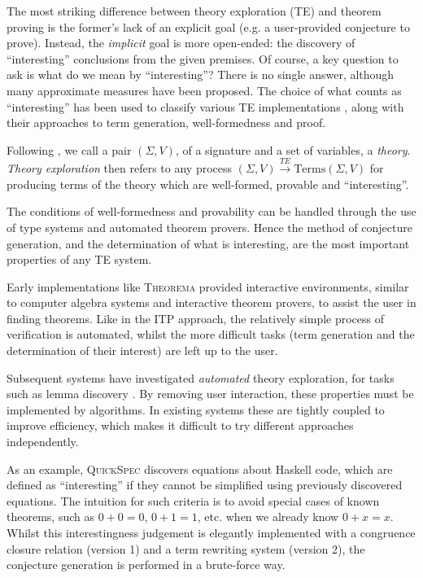 \documentclass[]{article}
\begin{document}
The most striking difference between theory exploration (TE) and theorem proving is the former's lack of an explicit goal (e.g. a user-provided conjecture to prove). Instead, the \emph{implicit} goal is more open-ended: the discovery of ``interesting'' conclusions from the given premises. Of course, a key question to ask is what do we mean by ``interesting''? There is no single answer, although many approximate measures have been proposed. The choice of what counts as ``interesting'' has been used to classify various TE implementations \cite{warburtonscaling}, along with their approaches to term generation, well-formedness and proof.

Following \cite{warburtonscaling}, we call a pair $(\Sigma, V)$, of a signature and a set of variables, a \emph{theory}. \emph{Theory exploration} then refers to any process $(\Sigma, V) \overset{TE}{\rightarrow} \text{Terms}(\Sigma, V)$ for producing terms of the theory which are well-formed, provable and ``interesting''.

The conditions of well-formedness and provability can be handled through the use of type systems and automated theorem provers. Hence the method of conjecture generation, and the determination of what is interesting, are the most important properties of any TE system.

Early implementations like \textsc{Theorema} \cite{buchberger2000theory} provided interactive environments, similar to computer algebra systems and interactive theorem provers, to assist the user in finding theorems. Like in the ITP approach, the relatively simple process of verification is automated, whilst the more difficult tasks (term generation and the determination of their interest) are left up to the user.

Subsequent systems have investigated \emph{automated} theory exploration, for tasks such as lemma discovery \cite{Hipster}. By removing user interaction, these properties must be implemented by algorithms. In existing systems these are tightly coupled to improve efficiency, which makes it difficult to try different approaches independently.

As an example, \textsc{QuickSpec} \cite{QuickSpec} discovers equations about Haskell code, which are defined as ``interesting'' if they cannot be simplified using previously discovered equations. The intuition for such criteria is to avoid special cases of known theorems, such as $0 + 0 = 0$, $0 + 1 = 1$, etc. when we already know $0 + x = x$. Whilst this interestingness judgement is elegantly implemented with a congruence closure relation (version 1) and a term rewriting system
(version 2), the conjecture generation is performed in a brute-force way.
\end{document}
